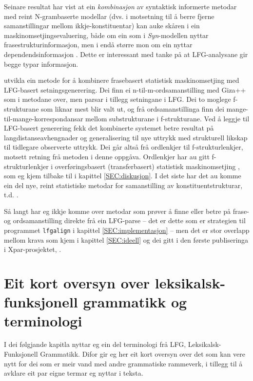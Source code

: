 \documentclass[12pt,a4paper,oneside,draft]{report}
\begin{document}
Seinare resultat har vist at ein \emph{kombinasjon} av syntaktisk
 informerte metodar med reint N-grambaserte modellar (dvs. i
 motsetning til å berre fjerne samanstillingar mellom
 ikkje\hyp{}konstituentar) kan auke skåren i ein
 maskinomsetjingsevaluering, både om ein som i \emph{Syn}-modellen nyttar
 frasestrukturinformasjon, men i endå større mon om ein nyttar
 dependendsinformasjon \citep{tinsley2007ept,hearne2008ccd}. Dette er
 interessant med tanke på at LFG-analysane gir begge typar
 informasjon.

\citet{riezler2006gmt} utvikla ein metode for å kombinere frasebasert
 statistisk maskinomsetjing med LFG-basert setningsgenerering. Dei
 finn ei n-til-m-ordsamanstilling med Giza++ som i metodane over, men
 parsar i tillegg setningane i LFG. Dei to moglege f\hyp{}strukturane
 som liknar mest blir valt ut, og frå ordsamanstillinga finn dei
 mange-til-mange-korrespondansar mellom substrukturane i
 f\hyp{}strukturane. Ved å leggje til LFG-basert generering fekk det
 kombinerte systemet betre resultat på langdistanseavhengnader og
 generalisering til nye uttrykk med strukturell likskap til tidlegare
 observerte uttrykk. Dei går altså frå ordlenkjer til
 f\hyp{}strukturlenkjer, motsett retning frå metoden i denne
 oppgåva. Ordlenkjer har au gitt f\hyp{}strukturlenkjer i
 overføringsbasert (transferbasert) statistisk maskinomsetjing
 \citep{graham2010dsl,graham2009osr,graham2009fts}, som eg kjem
 tilbake til i kapittel \ref{SEC:diskusjon}. I det siste har det au
 komme ein del nye, reint statistiske metodar for samanstilling av
 konstituentstrukturar, t.d. \citet{zhechev2008agp,tiedemann2009dat}.

Så langt har eg ikkje komme over metodar som prøver å finne eller
 betre på frase- og ordsamanstilling direkte frå ein LFG-parse -- det
 er dette som er strategien til programmet \texttt{lfgalign} i kapittel
 \ref{SEC:implementasjon} -- men det er stor overlapp mellom krava som
 kjem i kapittel \ref{SEC:ideell} 
 \citep[i tillegg nemnt i][]{unhammer2010lcf}
 og dei gitt i den første publiseringa i
 Xpar-prosjektet, \citet{dyvik2009lmp}.

\section{Eit kort oversyn over leksikalsk-funksjonell grammatikk og terminologi}
\label{sec-2.2}

 \label{SEC:omgrepsavklaring}

 I dei følgjande kapitla nyttar eg ein del terminologi frå LFG,
 Leksikalsk-Funksjonell Grammatikk. Difor gir eg her eit kort oversyn
 over det som kan vere nytt for dei som er meir vand med andre
 grammatiske rammeverk, i tillegg til å avklare eit par eigne termar
 eg nyttar i teksta.
\end{document}
